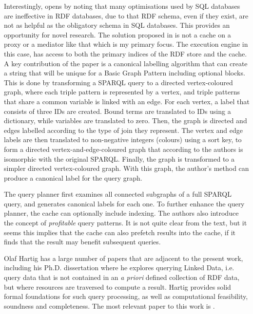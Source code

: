 Interestingly, \cite{papailiou2015graph} opens by noting that many
optimisations used by SQL databases are ineffective in RDF databases,
due to that RDF schema, even if they exist, are not as helpful as the
obligatory schema in SQL databases. This provides an opportunity for
novel research. The solution proposed in \cite{papailiou2015graph}  is not a cache on
a proxy or a mediator like that which is my primary focus. The execution engine
in this case, has access to both the primary indices of the RDF store
and the cache. A key contribution of the paper is a canonical
labelling algorithm that can create a string that will be unique for a
Basic Graph Pattern including optional blocks. This is done by
transforming a SPARQL query to a directed vertex-coloured graph, where
each triple pattern is represented by a vertex, and triple patterns
that share a common variable is linked with an edge. For each vertex,
a label that consists of three IDs are created. Bound terms are
translated to IDs using a dictionary, while variables are translated
to zero. Then, the graph is directed and edges labelled according to
the type of join they represent. The vertex and edge labels are then
translated to non-negative integers (colours) using a sort key, to
form a directed vertex-and-edge-coloured graph that according to the
authors is isomorphic with the original SPARQL. Finally, the graph is
transformed to a simpler directed vertex-coloured graph. With this
graph, the author's method can produce a canonical label for the query
graph.

The query planner first examines all connected subgraphs of a full
SPARQL query, and generates canonical labels for each one. To
further enhance the query planner, the cache can optionally include
indexing. The authors also introduce the concept of
\textit{profitable} query patterns. It is not quite clear from the
text, but it seems this implies that the cache can also prefetch
results into the cache, if it finds that the result may benefit
subsequent queries.

Olaf Hartig has a large number of papers that are adjacent to the
present work, including his Ph.D. dissertation \cite{hartig2014querying} where he
explores querying Linked Data, i.e. query data that is not contained
in an \textit{a priori} defined collection of RDF data, but where resources
are traversed to compute a result. Hartig provides solid formal
foundations for such query processing, as well as computational
feasibility, soundness and completeness. The most relevant paper to
this work is \cite{hartig2011caching}.

